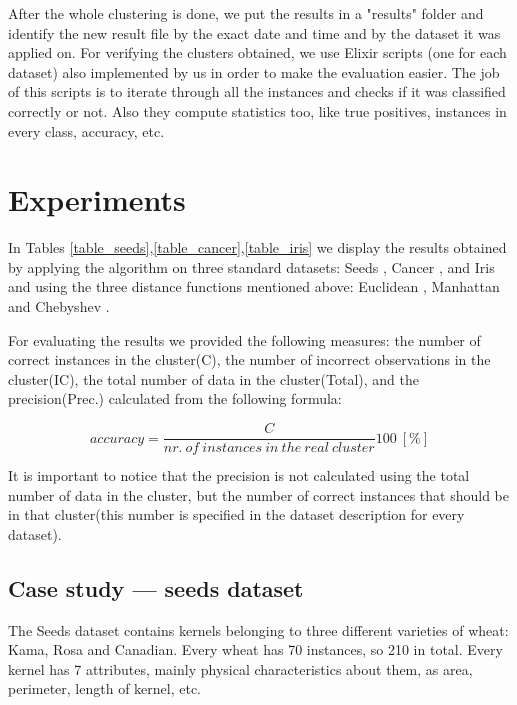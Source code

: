 \documentclass[conference]{IEEEtran}
\begin{document}
After the whole clustering is done, we put the results in a "results" folder and identify the new result file by the exact date and time and by the dataset it was applied on. For verifying the clusters obtained, we use Elixir scripts (one for each dataset) also implemented by us in order to make the evaluation easier. The job of this scripts is to iterate through all the instances and checks if it was classified correctly or not. Also they compute statistics too, like true positives, instances in every class, accuracy, etc.

\section{Experiments}
\label{Experiments}

In Tables \ref{table_seeds},\ref{table_cancer},\ref{table_iris} we display the results obtained by applying the algorithm on three standard datasets: Seeds \cite{website:seeds} , Cancer \cite{website:breastcancer} , and Iris \cite{website:iris} and using the three distance functions mentioned above: Euclidean \cite{website:euclidean} , Manhattan \cite{website:manhattan} and Chebyshev \cite{website:chebyshev}.

For evaluating the results we provided the following measures: the number of correct instances in the cluster(C), the number of incorrect observations in the cluster(IC), the total number of data in the cluster(Total), and the precision(Prec.) calculated from the following formula:

\begin{equation}
	accuracy= \frac{C}{nr.\ of\ instances\ in\ the\ real\ cluster}100 ~[\%]
\end{equation}

It is important to notice that the precision is not calculated using the total number of data in the cluster, but the number of correct instances that should be in that cluster(this number is specified in the dataset description for every dataset).

\subsection{Case study --- seeds dataset}

The Seeds dataset \cite{website:seeds} contains kernels belonging to three different varieties of wheat: Kama, Rosa and Canadian. Every wheat has 70 instances, so 210 in total. Every kernel has 7 attributes, mainly physical characteristics about them, as area, perimeter, length of kernel, etc.
\end{document}
